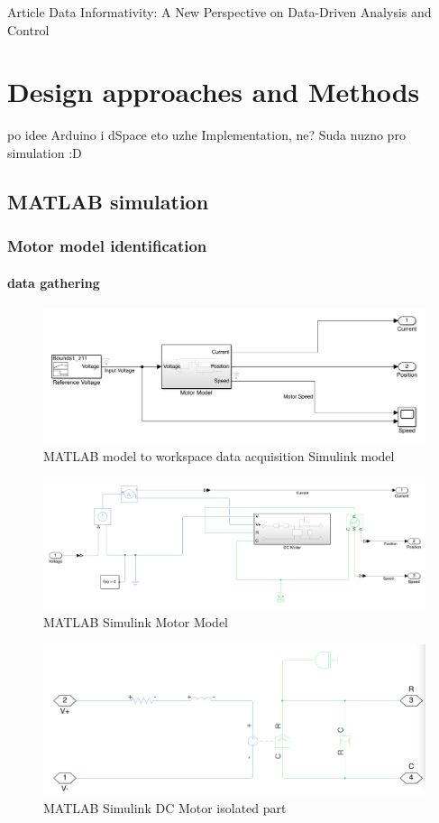 \documentclass[]{final_report}
\begin{document}
Article \cite{Waarde2020} Data Informativity: A New Perspective on Data-Driven Analysis and Control

\chapter{Design approaches and Methods}

po idee Arduino i dSpace eto uzhe Implementation, ne? Suda nuzno pro simulation :D

\section{MATLAB simulation}
\subsection{Motor model identification}
\subsubsection{data gathering}

\begin{figure} [h!]
\centerline{\includegraphics[width=.75\textwidth]{Screenshots for paper/matlab models/data aq model.png}}
\caption{MATLAB model to workspace data acquisition Simulink model}
\label{fig:MATLABmodelAT1}
\end{figure}

\begin{figure} [h!]
\centerline{\includegraphics[width=.75\textwidth]{Screenshots for paper/matlab models/Motor Model.png}}
\caption{MATLAB Simulink Motor Model}
\label{fig:MatlabMotorModel}
\end{figure}

\begin{figure} [h!]
\centerline{\includegraphics[width=.75\textwidth]{Screenshots for paper/matlab models/DC Motor.png}}
\caption{MATLAB Simulink DC Motor isolated part}
\label{fig:MatlabMotorDCpart}
\end{figure}
\end{document}
